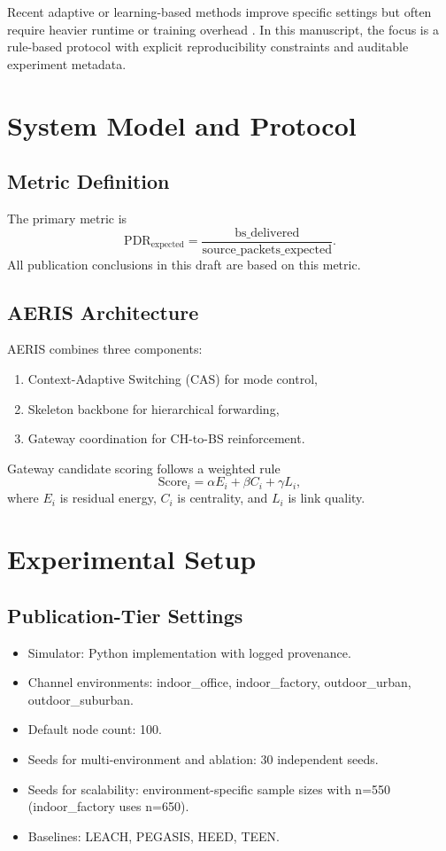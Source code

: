 ﻿\documentclass[sensors,article,submit,moreauthors,pdftex]{Definitions/mdpi}
\begin{document}
Recent adaptive or learning-based methods improve specific settings but often require heavier runtime or training overhead \cite{Ren2024,Okine2024}. In this manuscript, the focus is a rule-based protocol with explicit reproducibility constraints and auditable experiment metadata.

\section{System Model and Protocol}
\subsection{Metric Definition}
The primary metric is
\begin{equation}
\mathrm{PDR}_{\mathrm{expected}} = \frac{\mathrm{bs\_delivered}}{\mathrm{source\_packets\_expected}}.
\end{equation}
All publication conclusions in this draft are based on this metric.

\subsection{AERIS Architecture}
AERIS combines three components:
\begin{enumerate}
\item Context-Adaptive Switching (CAS) for mode control,
\item Skeleton backbone for hierarchical forwarding,
\item Gateway coordination for CH-to-BS reinforcement.
\end{enumerate}
Gateway candidate scoring follows a weighted rule
\begin{equation}
\mathrm{Score}_i = \alpha E_i + \beta C_i + \gamma L_i,
\end{equation}
where $E_i$ is residual energy, $C_i$ is centrality, and $L_i$ is link quality.

\section{Experimental Setup}
\subsection{Publication-Tier Settings}
\begin{itemize}
\item Simulator: Python implementation with logged provenance.
\item Channel environments: indoor\_office, indoor\_factory, outdoor\_urban, outdoor\_suburban.
\item Default node count: 100.
\item Seeds for multi-environment and ablation: 30 independent seeds.
\item Seeds for scalability: environment-specific sample sizes with n=550 (indoor\_factory uses n=650).
\item Baselines: LEACH, PEGASIS, HEED, TEEN.
\end{itemize}
\end{document}
